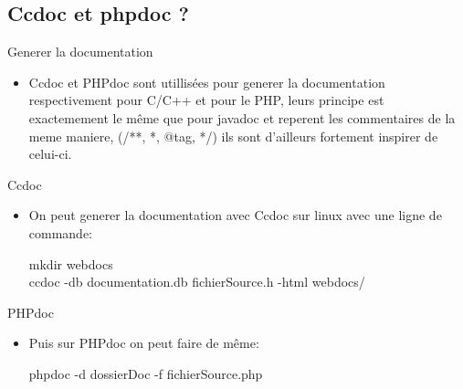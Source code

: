 \documentclass{beamer}
\begin{document}
\subsection{Ccdoc et phpdoc ?}

\begin{frame}{Generer la documentation}
\begin{itemize}
    \item {
    Ccdoc et PHPdoc sont utillisées pour generer la documentation respectivement pour C/C++ et pour le PHP, leurs principe est exactemement le même que pour javadoc et reperent les commentaires de la meme maniere, (/**, *, @tag, */) ils sont d'ailleurs fortement inspirer de celui-ci.
}
\end{itemize}
\end{frame}


\begin{frame}{Ccdoc}
\begin{itemize}
    \item {
    On peut generer la documentation avec Ccdoc sur linux avec une ligne de commande:
    
    \begin{example}
    mkdir webdocs \\
    ccdoc -db documentation.db fichierSource.h -html webdocs/ \\
    \end{example}
}

\end{itemize}
\end{frame}


\begin{frame}{PHPdoc}
\begin{itemize}
    \item {
    Puis sur PHPdoc on peut faire de même:
    
    \begin{example} 
    phpdoc -d dossierDoc -f fichierSource.php
    \end{example}
}
\end{itemize}
\end{frame}


















\end{document}
